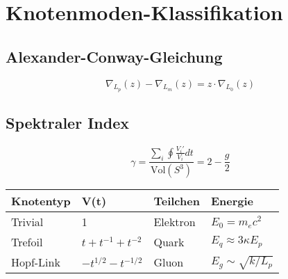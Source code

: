 \section{Knotenmoden-Klassifikation}

\subsection{Alexander-Conway-Gleichung}
\[
\nabla_{L_p}(z) - \nabla_{L_m}(z) = z \cdot \nabla_{L_0}(z)
\]

\subsection{Spektraler Index}
\[
\gamma = \frac{\sum_i \oint \frac{V_i'}{V_i} dt}{\text{Vol}(S^3)} = 2 - \frac{g}{2}
\]

\begin{table}[h]
\centering
\begin{tabular}{|l|l|l|l|}
\hline
\textbf{Knotentyp} & \textbf{V(t)} & \textbf{Teilchen} & \textbf{Energie} \\ \hline
Trivial & 1 & Elektron & $E_0 = m_e c^2$ \\ \hline
Trefoil & $t + t^{-1} + t^{-2}$ & Quark & $E_q \approx 3\kappa E_p$ \\ \hline
Hopf-Link & $-t^{1/2} - t^{-1/2}$ & Gluon & $E_g \sim \sqrt{k/L_p}$ \\ \hline
\end{tabular}
\end{table}